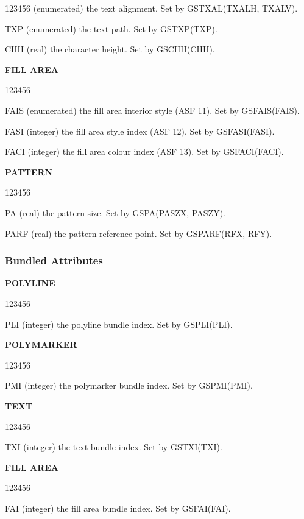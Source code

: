 \begin{UL}
\begin{DLtt}{123456}
(enumerated) the text alignment. Set by GSTXAL(TXALH, TXALV).
\item[TXP]
(enumerated) the text path. Set by GSTXP(TXP).
\item[CHH]
(real) the character height. Set by GSCHH(CHH).
\end{DLtt}
\item {\bf FILL AREA}
\begin{DLtt}{123456}
\item[FAIS]
(enumerated) the fill area interior style (ASF 11). Set by GSFAIS(FAIS).
\item[FASI]
(integer) the fill area style index (ASF 12). Set by GSFASI(FASI).
\item[FACI]
(integer) the fill area colour index (ASF 13). Set by GSFACI(FACI).
\end{DLtt}
\item {\bf PATTERN}
\begin{DLtt}{123456}
\item[PA]
(real) the pattern size. Set by GSPA(PASZX, PASZY).
\item[PARF]
(real) the pattern reference point. Set by GSPARF(RFX, RFY).
\end{DLtt}
\end{UL}
\subsubsection{\protect\label{sec:setbnd}Bundled Attributes}
\begin{UL}
\item {\bf POLYLINE}
\begin{DLtt}{123456}
\item[PLI]
(integer) the polyline bundle index. Set by GSPLI(PLI).
\end{DLtt}
\item {\bf POLYMARKER}
\begin{DLtt}{123456}
\item[PMI]
(integer) the polymarker bundle index. Set by GSPMI(PMI).
\end{DLtt}
\item {\bf TEXT}
\begin{DLtt}{123456}
\item[TXI]
(integer) the text bundle index. Set by GSTXI(TXI).
\end{DLtt}
\item {\bf FILL AREA}
\begin{DLtt}{123456}
\item[FAI]
(integer) the fill area bundle index. Set by GSFAI(FAI).
\end{DLtt}
\end{UL}
